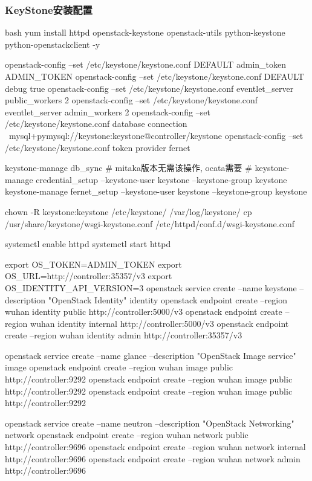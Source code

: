 \subsubsection{KeyStone安装配置}
\begin{code-block}{bash}
yum install httpd openstack-keystone openstack-utils python-keystone python-openstackclient -y

openstack-config --set /etc/keystone/keystone.conf DEFAULT admin_token ADMIN_TOKEN
openstack-config --set /etc/keystone/keystone.conf DEFAULT debug true
openstack-config --set /etc/keystone/keystone.conf eventlet_server public_workers 2
openstack-config --set /etc/keystone/keystone.conf eventlet_server admin_workers 2
openstack-config --set /etc/keystone/keystone.conf database connection \
    mysql+pymysql://keystone:keystone@controller/keystone
openstack-config --set /etc/keystone/keystone.conf token provider fernet

keystone-manage db_sync
# mitaka版本无需该操作, ocata需要
# keystone-manage credential_setup --keystone-user keystone --keystone-group keystone
keystone-manage fernet_setup --keystone-user keystone --keystone-group keystone

chown -R keystone:keystone /etc/keystone/ /var/log/keystone/
cp /usr/share/keystone/wsgi-keystone.conf /etc/httpd/conf.d/wsgi-keystone.conf

systemctl enable httpd
systemctl start httpd

export OS_TOKEN=ADMIN_TOKEN
export OS_URL=http://controller:35357/v3
export OS_IDENTITY_API_VERSION=3
openstack service create --name keystone --description "OpenStack Identity" identity
openstack endpoint create --region wuhan identity public http://controller:5000/v3
openstack endpoint create --region wuhan identity internal http://controller:5000/v3
openstack endpoint create --region wuhan identity admin http://controller:35357/v3

openstack service create --name glance --description "OpenStack Image service" image
openstack endpoint create --region wuhan  image public http://controller:9292
openstack endpoint create --region wuhan  image public http://controller:9292
openstack endpoint create --region wuhan  image public http://controller:9292

openstack service create --name neutron  --description "OpenStack Networking" network
openstack endpoint create --region wuhan network public http://controller:9696
openstack endpoint create --region wuhan network internal http://controller:9696
openstack endpoint create --region wuhan network admin http://controller:9696


\end{code-block}
